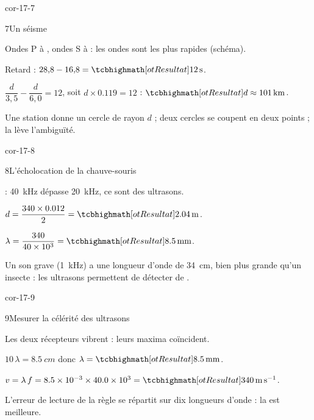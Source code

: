 \begin{blocLivre}{cor-17-7}
\begin{corrige}{7}{Un séisme}
\begin{questions}
\item Ondes P à , ondes S à  : les ondes  sont les plus rapides (schéma).
\item Retard : $28{,}8-16{,}8=\res{\qty{12}{s}}$.
\item $\dfrac{d}{3{,}5}-\dfrac{d}{6{,}0}=12$, soit $d\times\num{0,119}=12$ : $\res{d\approx\qty{101}{km}}$.
\item Une station donne un cercle de rayon $d$ ; deux cercles se coupent en deux points ; la  lève l'ambiguïté.
\end{questions}
\end{corrige}
\end{blocLivre}
\begin{blocLivre}{cor-17-8}
\begin{corrige}{8}{L'écholocation de la chauve-souris}
\begin{questions}
\item {} : \qty{40}{kHz} dépasse \qty{20}{kHz}, ce sont des ultrasons.
\item $d=\dfrac{340\times\num{0,012}}{2}=\res{\qty{2,04}{m}}$.
\item $\lambda=\dfrac{340}{\num{40e3}}=\res{\qty{8,5}{mm}}$.
\item Un son grave (\qty{1}{kHz}) a une longueur d'onde de \qty{34}{cm}, bien plus grande qu'un insecte : les ultrasons permettent de détecter de .
\end{questions}
\end{corrige}
\end{blocLivre}
\begin{blocLivre}{cor-17-9}
\begin{corrige}{9}{Mesurer la célérité des ultrasons}
\begin{questions}
\item Les deux récepteurs vibrent  : leurs maxima coïncident.
\item $10\,\lambda=\qty{8,5}{cm}$ donc $\lambda=\res{\qty{8,5}{mm}}$.
\item $v=\lambda\,f=\num{8,5e-3}\times\num{40,0e3}=\res{\qty{340}{m.s^{-1}}}$.
\item L'erreur de lecture de la règle se répartit sur dix longueurs d'onde : la  est meilleure.
\end{questions}
\end{corrige}
\end{blocLivre}
